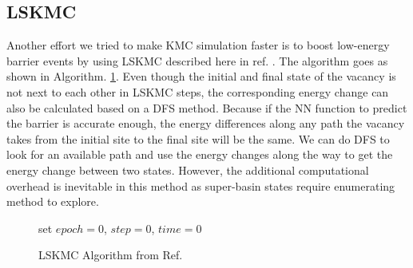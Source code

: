 \subsection{\acf{LSKMC}}
Another effort we tried to make \ac{KMC} simulation faster is to boost low-energy barrier events by using \acf{LSKMC} described here in ref. \cite{fichthorn2013local}. The algorithm goes as shown in Algorithm. \ref{algo:lskmc}. Even though the initial and final state of the vacancy is not next to each other in \ac{LSKMC} steps, the corresponding energy change can also be calculated based on a \ac{DFS} method. Because if the \ac{NN} function to predict the barrier is accurate enough, the energy differences along any path the vacancy takes from the initial site to the final site will be the same. We can do \ac{DFS} to look for an available path and use the energy changes along the way to get the energy change between two states. However, the additional computational overhead is inevitable in this method as super-basin states require enumerating method to explore. 

\begin{figure}[!htb]
  \centering
  \begin{minipage}{.75\linewidth}
    \begin{algorithm}[H]
      \caption{\acf{LSKMC} Algorithm from  Ref. \cite{fichthorn2013local}}\label{algo:lskmc}
      \begin{algorithmic}[1]
        \State set $epoch = 0$, $step = 0$, $time = 0$
        \Else 
        \EndIf
        \EndIf
        
        \EndWhile
      \end{algorithmic}
    \end{algorithm}
  \end{minipage}
\end{figure}

